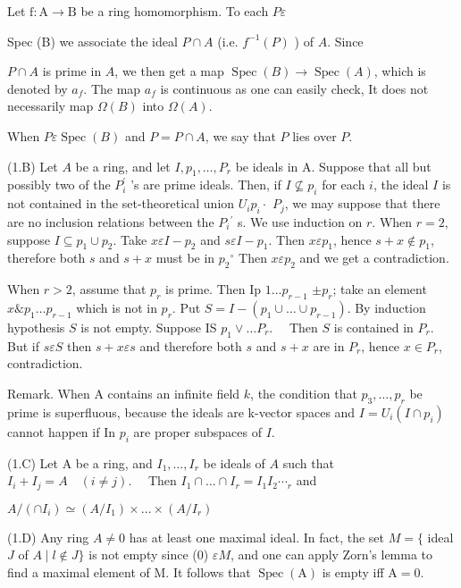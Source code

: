 Let $\mathrm{f}: \mathrm{A} \rightarrow \mathrm{B}$ be a ring homomorphism. To each $P \varepsilon$

Spec (B) we associate the ideal $P \cap A$ (i.e. $f^{-1}(P)$ ) of $A$. Since

$P \cap A$ is prime in $A$, we then get a map $\operatorname{Spec}(B) \rightarrow \operatorname{Spec}(A)$, which is denoted by $a_{f}$. The map $a_{f}$ is continuous as one can easily check, It does not necessarily map $\Omega(B)$ into $\Omega(A)$.

When $P \varepsilon \operatorname{Spec}(B)$ and $P=P \cap A$, we say that $P$ lies over $P$.

(1.B) Let $A$ be a ring, and let $I, p_{1}, \ldots, P_{r}$ be ideals in A. Suppose that all but possibly two of the $P_{i}^{\prime}$ 's are prime ideals. Then, if $I \nsubseteq p_{i}$ for each $i$, the ideal $I$ is not contained in the set-theoretical union $U_{i} p_{i} \cdot$ $P_{j}$, we may suppose that there are no inclusion relations between the $P_{i}{ }^{\prime}$ s. We use induction on $r$. When $r=2$, suppose $I \subseteq p_{1} \cup p_{2}$. Take $x \varepsilon I-p_{2}$ and $s \varepsilon I-p_{1}$. Then $x \varepsilon p_{1}$, hence $s+x \notin p_{1}$, therefore both $s$ and $s+x$ must be in $p_{2}{ }^{\circ}$ Then $x \varepsilon p_{2}$ and we get a contradiction.

When $r>2$, assume that $p_{r}$ is prime. Then Ip $1 \ldots p_{r-1}$ $\pm p_{r}$; take an element $x \& p_{1} \ldots p_{r-1}$ which is not in $p_{r}$. Put $S=I-\left(p_{1} \cup \ldots \cup p_{r-1}\right)$. By induction hypothesis $S$ is not empty. Suppose IS $p_{1} \vee \ldots P_{r} . \quad$ Then $S$ is contained in $P_{r}$. But if $s \varepsilon S$ then $s+x \varepsilon s$ and therefore both $s$ and $s+x$ are in $P_{r}$, hence $x \in P_{r}$, contradiction.

Remark. When A contains an infinite field $k$, the condition that $p_{3}, \ldots, p_{r}$ be prime is superfluous, because the ideals are k-vector spaces and $I=U_{i}\left(I \cap p_{i}\right)$ cannot happen if In $p_{i}$ are proper subspaces of $I$.

(1.C) Let A be a ring, and $I_{1}, \ldots, I_{r}$ be ideals of $A$ such that $I_{i}+I_{j}=A \quad(i \neq j) . \quad$ Then $I_{1} \cap \ldots \cap I_{r}=I_{1} I_{2} \cdots_{r}$ and

$A /\left(\cap I_{i}\right) \simeq\left(A / I_{1}\right) \times \ldots \times\left(A / I_{r}\right)$

(1.D) Any ring $A \neq 0$ has at least one maximal ideal. In fact, the set $M=\{$ ideal $J$ of $A \mid l \notin J\}$ is not empty since (0) $\varepsilon M$, and one can apply Zorn's lemma to find a maximal element of M. It follows that $\operatorname{Spec}(\mathrm{A})$ is empty iff $\mathrm{A}=0$.

